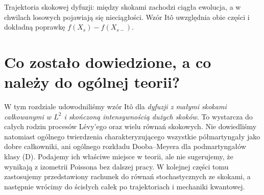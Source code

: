 \begin{center}
\par\smallskip\small Trajektoria skokowej dyfuzji:
między skokami zachodzi ciągła ewolucja, a w chwilach
losowych pojawiają się nieciągłości. Wzór Itô uwzględnia
obie części i dokładną poprawkę $f(X_s)-f(X_{s-})$.
\end{center}

\section{Co zostało dowiedzione, a co należy do ogólnej teorii?}

W tym rozdziale udowodniliśmy wzór Itô dla
\emph{dyfuzji z małymi skokami całkowanymi w $L^2$
i skończoną intensywnością dużych skoków}.
To wystarcza do całych rodzin procesów Lévy'ego oraz
wielu równań skokowych. Nie dowiedliśmy natomiast
ogólnego twierdzenia charakteryzującego wszystkie
półmartyngały jako dobre całkowniki, ani ogólnego
rozkładu Dooba--Meyera dla podmartyngałów klasy (D).
Podajemy ich właściwe miejsce w teorii, ale nie sugerujemy,
że wynikają z izometrii Poissona bez dalszej pracy.
W kolejnej części tomu zastosujemy przedstawiony rachunek
do równań stochastycznych ze skokami, a następnie wrócimy
do ścisłych całek po trajektoriach i mechaniki kwantowej.

